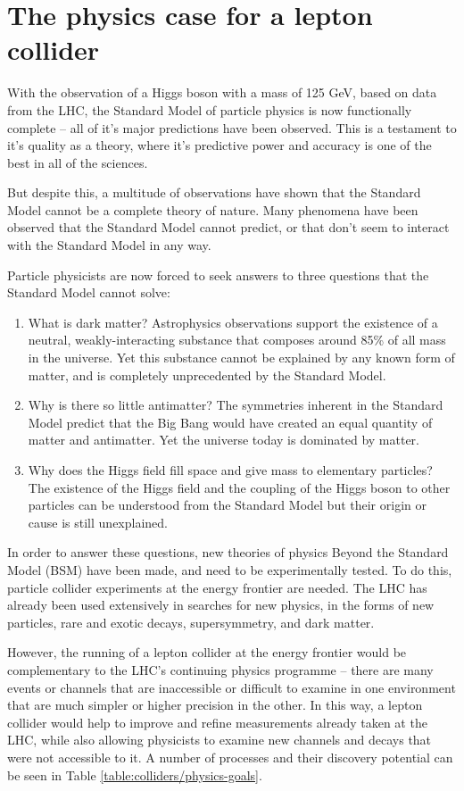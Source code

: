 \section{The physics case for a lepton collider}
With the observation of a Higgs boson with a mass of 125 GeV, based on data from the \acrlong{LHC}, the Standard Model of particle physics is now functionally complete -- all of it's major predictions have been observed. This is a testament to it's quality as a theory, where it's predictive power and accuracy is one of the best in all of the sciences.

But despite this, a multitude of observations have shown that the Standard Model cannot be a complete theory of nature. Many phenomena have been observed that the Standard Model cannot predict, or that don't seem to interact with the Standard Model in any way.

Particle physicists are now forced to seek answers to three questions that the Standard Model cannot solve:

\begin{enumerate}
	\item What is dark matter? Astrophysics observations support the existence of a neutral, weakly-interacting substance that composes around 85\% of all mass in the universe. Yet this substance cannot be explained by any known form of matter, and is completely unprecedented by the Standard Model.
	\item Why is there so little antimatter? The symmetries inherent in the Standard Model predict that the Big Bang would have created an equal quantity of matter and antimatter. Yet the universe today is dominated by matter.
	\item Why does the Higgs field fill space and give mass to elementary particles? The existence of the Higgs field and the coupling of the Higgs boson to other particles can be understood from the Standard Model but their origin or cause is still unexplained.
\end{enumerate}

In order to answer these questions, new theories of physics Beyond the Standard Model (\acrshort{BSM}) have been made, and need to be experimentally tested. To do this, particle collider experiments at the energy frontier are needed. The \acrfull{LHC} has already been used extensively in searches for new physics, in the forms of new particles, rare and exotic decays, supersymmetry, and dark matter.

However, the running of a lepton collider at the energy frontier would be complementary to the \acrshort{LHC}'s continuing physics programme -- there are many events or channels that are inaccessible or difficult to examine in one environment that are much simpler or higher precision in the other. In this way, a lepton collider would help to improve and refine measurements already taken at the \acrshort{LHC}, while also allowing physicists to examine new channels and decays that were not accessible to it. A number of processes and their discovery potential can be seen in Table \ref{table:colliders/physics-goals}.

